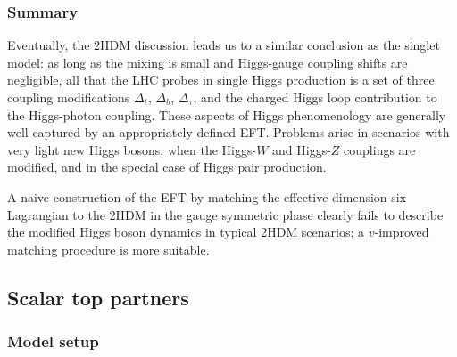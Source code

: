 \subsubsection{Summary}

Eventually, the 2HDM discussion leads us to a similar conclusion as
the singlet model: as long as the mixing is small and Higgs-gauge
coupling shifts are negligible, all that the LHC probes in single
Higgs production is a set of three coupling modifications $\Delta_t$,
$\Delta_b$, $\Delta_\tau$, and the charged Higgs loop contribution to
the Higgs-photon coupling. These aspects of Higgs phenomenology are
generally well captured by an appropriately defined EFT. Problems
arise in scenarios with very light new Higgs bosons, when the
Higgs-$W$ and Higgs-$Z$ couplings are modified, and in the special
case of Higgs pair production.

A naive construction of the EFT by matching the effective
dimension-six Lagrangian to the 2HDM in the gauge symmetric phase
clearly fails to describe the modified Higgs boson dynamics in typical
2HDM scenarios; a $v$-improved matching procedure is more suitable.



\subsection{Scalar top partners}
\label{sec:validity_stops}

\subsubsection{Model setup}

